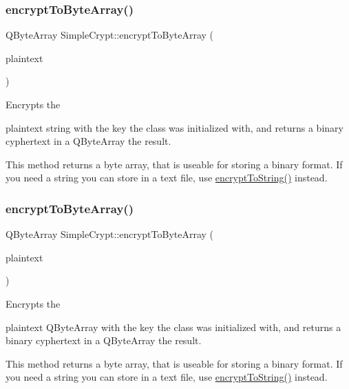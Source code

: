 \subsubsection{\texorpdfstring{encryptToByteArray()}{encryptToByteArray()}\hspace{0.1cm}{\footnotesize\ttfamily [1/2]}}
{\footnotesize\ttfamily Q\+Byte\+Array Simple\+Crypt\+::encrypt\+To\+Byte\+Array (\begin{DoxyParamCaption}\item[{const Q\+String \&}]{plaintext }\end{DoxyParamCaption})}

Encrypts the \begin{DoxyItemize}
\item plaintext string with the key the class was initialized with, and returns a binary cyphertext in a Q\+Byte\+Array the result.\end{DoxyItemize}
This method returns a byte array, that is useable for storing a binary format. If you need a string you can store in a text file, use \mbox{\hyperlink{class_simple_crypt_af26a3d3c6cef9732190c1d2c6a53a5b5}{encrypt\+To\+String()}} instead. \mbox{\label{class_simple_crypt_a741305d04e86bcb7d4625b05bf234887}} 
\subsubsection{\texorpdfstring{encryptToByteArray()}{encryptToByteArray()}\hspace{0.1cm}{\footnotesize\ttfamily [2/2]}}
{\footnotesize\ttfamily Q\+Byte\+Array Simple\+Crypt\+::encrypt\+To\+Byte\+Array (\begin{DoxyParamCaption}\item[{Q\+Byte\+Array}]{plaintext }\end{DoxyParamCaption})}

Encrypts the \begin{DoxyItemize}
\item plaintext Q\+Byte\+Array with the key the class was initialized with, and returns a binary cyphertext in a Q\+Byte\+Array the result.\end{DoxyItemize}
This method returns a byte array, that is useable for storing a binary format. If you need a string you can store in a text file, use \mbox{\hyperlink{class_simple_crypt_af26a3d3c6cef9732190c1d2c6a53a5b5}{encrypt\+To\+String()}} instead. \mbox{\label{class_simple_crypt_af26a3d3c6cef9732190c1d2c6a53a5b5}} 
